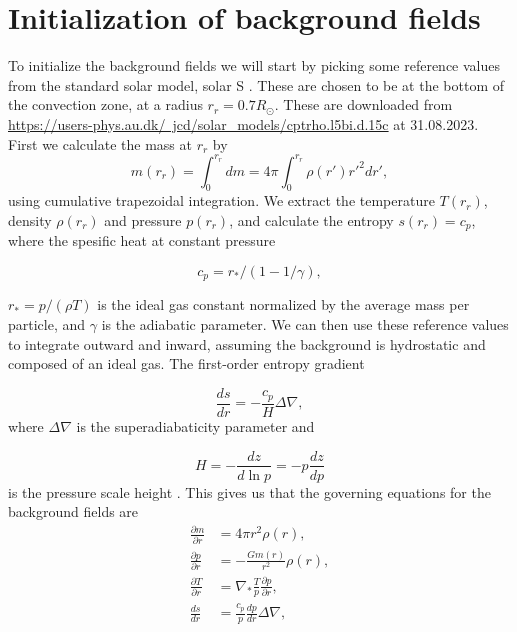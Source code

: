 \documentclass{article}
\begin{document}
\section{Initialization of background fields}
To initialize the background fields we will start by picking some reference values from the standard solar model, solar S \citep{1996Sci...272.1286C}. These are chosen to be at the bottom of the convection zone, at a radius  $r_r=0.7R_{\odot}$. These are downloaded from \href{https://users-phys.au.dk/~jcd/solar_models/cptrho.l5bi.d.15c}{https://users-phys.au.dk/~jcd/solar_models/cptrho.l5bi.d.15c} at 31.08.2023. First we calculate the mass at $r_r$ by
\begin{equation}
    m(r_r)=\int_0^{r_r} dm = 4\pi \int_0^{r_r} \rho(r')r'^2 dr',
\end{equation}
using cumulative trapezoidal integration. We extract the temperature $T(r_r)$, density $\rho(r_r)$ and pressure $p(r_r)$, and calculate the entropy $s(r_r)=c_p$, where the spesific heat at constant pressure

\begin{equation*}
    c_p = r_*/(1-1/\gamma),
\end{equation*}

$r_*=p/(\rho T)$ is the ideal gas constant normalized by the average mass per particle, and $\gamma$ is the adiabatic parameter. We can then use these reference values to integrate outward and inward, assuming the background is hydrostatic and composed of an ideal gas. The first-order entropy gradient 

\begin{equation*}
    \frac{ds}{dr} = -\frac{c_p}{H} \Delta\nabla,
\end{equation*}
where $\Delta\nabla$ is the superadiabaticity parameter and

\begin{equation*}
    H = - \frac{dz}{d\ln p} = - p\frac{dz}{dp}
\end{equation*}
is the pressure scale height \citep{1999ApJS..121..247L}. This gives us that the governing equations for the background fields are
\begin{align}
    \frac{\partial m}{\partial r} &= 4\pi r^2\rho(r), \label{eq:dm_dr}\\
    \frac{\partial p}{\partial r} &= -\frac{G m(r)}{r^2}\rho(r), \label{eq:dp_dr}\\
    \frac{\partial T}{\partial r} &= \nabla_{*} \frac{T}{p}\frac{\partial p}{\partial r}, \label{eq:dT_dr}\\
    \frac{ds}{dr} &=\frac{c_p}{p}\frac{dp}{dr}\Delta\nabla, \label{eq:ds_dr}
\end{align}
\end{document}
